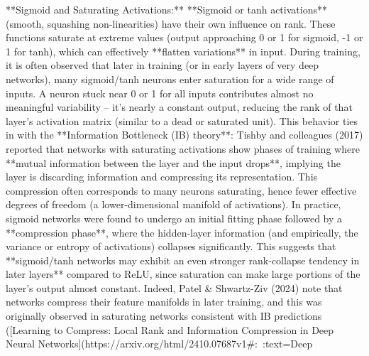 **Sigmoid and Saturating Activations:** **Sigmoid or tanh activations** (smooth, squashing non-linearities) have their own influence on rank. These functions saturate at extreme values (output approaching 0 or 1 for sigmoid, -1 or 1 for tanh), which can effectively **flatten variations** in input. During training, it is often observed that later in training (or in early layers of very deep networks), many sigmoid/tanh neurons enter saturation for a wide range of inputs. A neuron stuck near 0 or 1 for all inputs contributes almost no meaningful variability – it’s nearly a constant output, reducing the rank of that layer’s activation matrix (similar to a dead or saturated unit). This behavior ties in with the **Information Bottleneck (IB) theory**: Tishby and colleagues (2017) reported that networks with saturating activations show phases of training where **mutual information between the layer and the input drops**, implying the layer is discarding information and compressing its representation. This compression often corresponds to many neurons saturating, hence fewer effective degrees of freedom (a lower-dimensional manifold of activations). In practice, sigmoid networks were found to undergo an initial fitting phase followed by a **compression phase**, where the hidden-layer information (and empirically, the variance or entropy of activations) collapses significantly. This suggests that **sigmoid/tanh networks may exhibit an even stronger rank-collapse tendency in later layers** compared to ReLU, since saturation can make large portions of the layer’s output almost constant. Indeed, Patel & Shwartz-Ziv (2024) note that networks compress their feature manifolds in later training, and this was originally observed in saturating networks consistent with IB predictions ([Learning to Compress: Local Rank and Information Compression in Deep Neural Networks](https://arxiv.org/html/2410.07687v1#:~:text=Deep%

